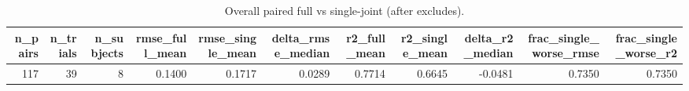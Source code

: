 \begin{table}
\caption{Overall paired full vs single-joint (after excludes).}
\label{tab:table0_overall}
\begin{tabular}{rrrrrrrrrrr}
\toprule
n_pairs & n_trials & n_subjects & rmse_full_mean & rmse_single_mean & delta_rmse_median & r2_full_mean & r2_single_mean & delta_r2_median & frac_single_worse_rmse & frac_single_worse_r2 \\
\midrule
117 & 39 & 8 & 0.1400 & 0.1717 & 0.0289 & 0.7714 & 0.6645 & -0.0481 & 0.7350 & 0.7350 \\
\bottomrule
\end{tabular}
\end{table}
